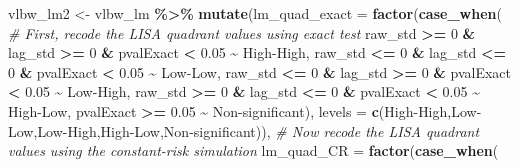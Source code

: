 \documentclass[
]{book}
\newenvironment{Shaded}{\begin{snugshade}}{\end{snugshade}}
\newcommand{\AttributeTok}[1]{\textcolor[rgb]{0.13,0.29,0.53}{#1}}
\newcommand{\CommentTok}[1]{\textcolor[rgb]{0.56,0.35,0.01}{\textit{#1}}}
\newcommand{\DecValTok}[1]{\textcolor[rgb]{0.00,0.00,0.81}{#1}}
\newcommand{\FloatTok}[1]{\textcolor[rgb]{0.00,0.00,0.81}{#1}}
\newcommand{\FunctionTok}[1]{\textcolor[rgb]{0.13,0.29,0.53}{\textbf{#1}}}
\newcommand{\NormalTok}[1]{#1}
\newcommand{\OtherTok}[1]{\textcolor[rgb]{0.56,0.35,0.01}{#1}}
\newcommand{\SpecialCharTok}[1]{\textcolor[rgb]{0.81,0.36,0.00}{\textbf{#1}}}
\newcommand{\StringTok}[1]{\textcolor[rgb]{0.31,0.60,0.02}{#1}}
\begin{document}
\begin{Shaded}
\begin{Highlighting}[]
\NormalTok{vlbw\_lm2 }\OtherTok{\textless{}{-}}\NormalTok{ vlbw\_lm }\SpecialCharTok{\%\textgreater{}\%}
  \FunctionTok{mutate}\NormalTok{(}\AttributeTok{lm\_quad\_exact =} \FunctionTok{factor}\NormalTok{(}\FunctionTok{case\_when}\NormalTok{(}
    \CommentTok{\# First, recode the LISA quadrant values using exact test}
\NormalTok{           raw\_std }\SpecialCharTok{\textgreater{}=} \DecValTok{0} \SpecialCharTok{\&}\NormalTok{ lag\_std }\SpecialCharTok{\textgreater{}=} \DecValTok{0} \SpecialCharTok{\&}\NormalTok{ pvalExact }\SpecialCharTok{\textless{}} \FloatTok{0.05} \SpecialCharTok{\textasciitilde{}} \StringTok{\textquotesingle{}High{-}High\textquotesingle{}}\NormalTok{,}
\NormalTok{            raw\_std }\SpecialCharTok{\textless{}=} \DecValTok{0} \SpecialCharTok{\&}\NormalTok{ lag\_std }\SpecialCharTok{\textless{}=} \DecValTok{0} \SpecialCharTok{\&}\NormalTok{ pvalExact }\SpecialCharTok{\textless{}} \FloatTok{0.05} \SpecialCharTok{\textasciitilde{}} \StringTok{\textquotesingle{}Low{-}Low\textquotesingle{}}\NormalTok{,}
\NormalTok{            raw\_std }\SpecialCharTok{\textless{}=} \DecValTok{0} \SpecialCharTok{\&}\NormalTok{ lag\_std }\SpecialCharTok{\textgreater{}=} \DecValTok{0} \SpecialCharTok{\&}\NormalTok{ pvalExact }\SpecialCharTok{\textless{}} \FloatTok{0.05} \SpecialCharTok{\textasciitilde{}} \StringTok{\textquotesingle{}Low{-}High\textquotesingle{}}\NormalTok{,}
\NormalTok{            raw\_std }\SpecialCharTok{\textgreater{}=} \DecValTok{0} \SpecialCharTok{\&}\NormalTok{ lag\_std }\SpecialCharTok{\textless{}=} \DecValTok{0} \SpecialCharTok{\&}\NormalTok{ pvalExact }\SpecialCharTok{\textless{}} \FloatTok{0.05} \SpecialCharTok{\textasciitilde{}} \StringTok{\textquotesingle{}High{-}Low\textquotesingle{}}\NormalTok{,}
\NormalTok{            pvalExact }\SpecialCharTok{\textgreater{}=} \FloatTok{0.05} \SpecialCharTok{\textasciitilde{}} \StringTok{\textquotesingle{}Non{-}significant\textquotesingle{}}\NormalTok{),}
           \AttributeTok{levels =} \FunctionTok{c}\NormalTok{(}\StringTok{\textquotesingle{}High{-}High\textquotesingle{}}\NormalTok{,}\StringTok{\textquotesingle{}Low{-}Low\textquotesingle{}}\NormalTok{,}\StringTok{\textquotesingle{}Low{-}High\textquotesingle{}}\NormalTok{,}\StringTok{\textquotesingle{}High{-}Low\textquotesingle{}}\NormalTok{,}\StringTok{\textquotesingle{}Non{-}significant\textquotesingle{}}\NormalTok{)),}
    \CommentTok{\# Now recode the LISA quadrant values using the constant{-}risk simulation}
          \AttributeTok{lm\_quad\_CR =} \FunctionTok{factor}\NormalTok{(}\FunctionTok{case\_when}\NormalTok{(}

\end{Highlighting}
\end{Shaded}
\end{document}
